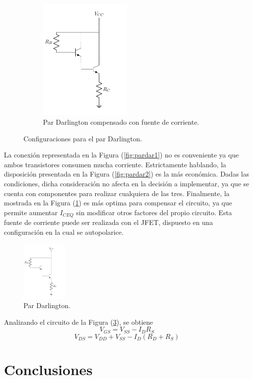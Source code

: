 \begin{figure}[H]
\begin{subfigure}{.5\textwidth}
\centering
	\includegraphics[width=0.5\textwidth, page=3]{Imagenes/ParDarlington.pdf}
	\caption{Par Darlington compensado con fuente de corriente.}
	\label{fig:pardar3}
\end{subfigure}
\caption{Configuraciones para el par Darlington.}
\label{fig:pardar}
\end{figure}

La conexión representada en la Figura (\ref{fig:pardar1}) no es conveniente ya que ambos transistores consumen mucha corriente. Estrictamente hablando, la disposición presentada en la Figura (\ref{fig:pardar2}) es la más económica. Dadas las condiciones, dicha consideración no afecta en la decisión a implementar, ya que se cuenta con componentes para realizar cualquiera de las tres. Finalmente, la mostrada en la Figura (\ref{fig:pardar3}) es más optima para compensar el circuito, ya que permite aumentar $I_{CEQ}$ sin modificar otros factores del propio circuito. Esta fuente de corriente puede ser realizada con el JFET, dispuesto en una configuración en la cual se autopolarice.
\begin{figure}[H]
\centering
	\includegraphics[width=0.2\textwidth, page=4]{Imagenes/ParDarlington.pdf}
	\caption{Par Darlington.}
	\label{fig:fuentei}
\end{figure}

Analizando el circuito de la Figura (\ref{fig:fuentei}), se obtiene
\begin{equation}
	V_{GS} = V_{SS} - I_{D} R_{S}
\end{equation}
\begin{equation}
	V_{DS} = V_{DD} + V_{SS} - I_{D} \left( R_{D} + R_{S} \right)
\end{equation}


\section{Conclusiones}
	
